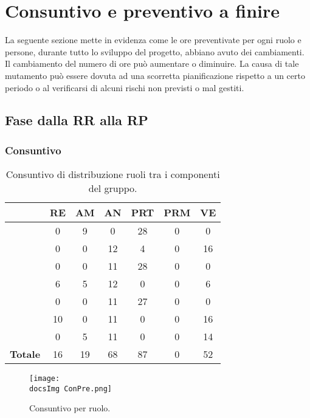 \section{Consuntivo e preventivo a finire}{

	La seguente sezione mette in evidenza come le ore preventivate per ogni ruolo e persone, durante tutto lo sviluppo del progetto, abbiano avuto dei cambiamenti.\\
	Il cambiamento del numero di ore può aumentare o diminuire. La causa di tale mutamento può essere dovuta ad una scorretta pianificazione rispetto a un certo periodo o al verificarsi di alcuni rischi non previsti o mal gestiti.
	
	\subsection{Fase dalla RR alla RP}{
	\subsubsection{Consuntivo}{
	\begin{table}[h!]
		\begin{center}
			\begin{tabular}{l c c c c c c}				
				\toprule
				&	RE& AM& AN& PRT& PRM& VE \\ 
				\midrule
				\BM	& 0	& 9	& 0  	& 28 	& 0 	& 0\\ 
				\BA	& 0	& 0	& 12 	& 4  	& 0 	& 16 \\
				\CD	& 0	& 0	& 11 	& 28 	&0 	& 0\\ 
				\LS	& 6	& 5	& 12 	& 0  	&0 	& 6\\
				\PV 	& 0	& 0	& 11 	& 27 	&0 	& 0\\
				\ZF 	& 10	& 0	& 11 	& 0  	&0 	& 16\\
				\ZE 	& 0	& 5	& 11 	& 0  	&0	& 14\\ \hline
				\textbf{Totale}&	 16 &	19 &		68	&	87 &		0 & 52\\
				\bottomrule
			\end{tabular}	
		\caption{Consuntivo di distribuzione ruoli tra i componenti del gruppo.}
		\end{center}
	\end{table}

	\begin{figure}[h!]
	\centering
		\texttt{[image: \\docsImg ConPre.png]}
		\caption{Consuntivo per ruolo.} 
	\end{figure}

}}}
